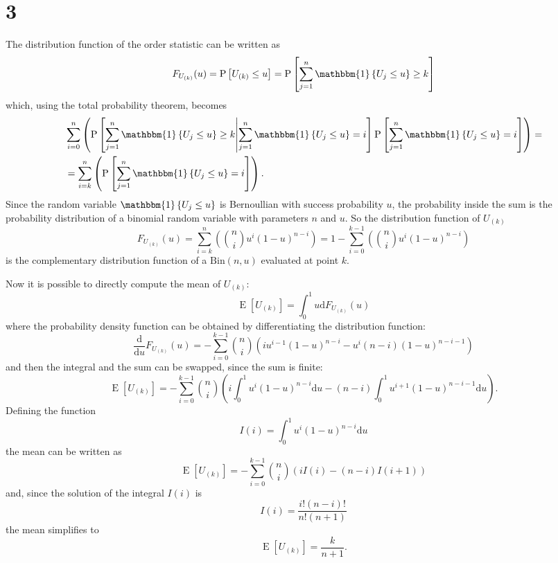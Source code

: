 \documentclass{article}
\newcommand{\E}[1]{\operatorname{E}\left[#1\right]}
\newcommand{\Prob}[1]{\operatorname{P}\left[#1\right]}
\newcommand{\ProbC}[2]{\operatorname{P}\left[#1\middle|#2\right]}
\newcommand{\ind}[1]{\operatorname{\mathbbm{1}}\left\{#1\right\}}
\begin{document}
\section*{3}
The distribution function of the order statistic can be written as
\[ F_{U_{(k)}}(u) = \Prob{U_{(k)} \leq u} = \Prob{\sum_{j=1}^n\ind{U_j \leq u} \geq k} \]
which, using the total probability theorem, becomes
\begin{align*}
  & \sum_{i=0}^n\left(\ProbC{\sum_{j=1}^n\ind{U_j \leq u} \geq k}{\sum_{j=1}^n\ind{U_j \leq u} = i}\Prob{\sum_{j=1}^n\ind{U_j \leq u} = i}\right) = \\
  &= \sum_{i=k}^n\left( \Prob{\sum_{j=1}^n\ind{U_j \leq u} = i} \right) . 
\end{align*}
Since the random variable $\ind{U_j \leq u}$ is Bernoullian with
success probability $u$, the probability inside the sum is the
probability distribution of a binomial random variable with parameters
$n$ and $u$. So the distribution function of $U_{(k)}$
\[  F_{U_{(k)}}(u) = \sum_{i=k}^n\left(\binom{n}{i}u^i(1-u)^{n-i}\right)
= 1 - \sum_{i=0}^{k-1}\left(\binom{n}{i}u^i(1-u)^{n-i}\right) \]
is the complementary distribution function of a
$\mathrm{Bin}(n,u)$ evaluated at point $k$.

Now it is possible to directly compute the mean of $U_{(k)}$:
\[ \E{U_{(k)}} = \int_0^1 u \mathrm{d} F_{U_{(k)}}(u) \]
where the probability density function can be obtained by
differentiating the distribution function:
\[ \frac{\mathrm{d}}{\mathrm{d}u} F_{U_{(k)}}(u) =
- \sum_{i=0}^{k-1}\binom{n}{i}\left( iu^{i-1}(1-u)^{n-i} - u^i(n-i)(1-u)^{n-i-1} \right) \]
and then the integral and the sum can be swapped, since the sum is finite:
\[ \E{U_{(k)}} = -\sum_{i=0}^{k-1}\binom{n}{i}\left( i\int_0^1u^i(1-u)^{n-i}\mathrm{d}u - (n-i)\int_0^1u^{i+1}(1-u)^{n-i-1}\mathrm{d}u \right) . \]
Defining the function
\[ I(i) = \int_0^1u^i(1-u)^{n-i} \mathrm{d}u \]
the mean can be written as
\[ \E{U_{(k)}} = -\sum_{i=0}^{k-1}\binom{n}{i}\left( iI(i) - (n-i)I(i+1) \right) \]
and, since the solution of the integral $I(i)$ is
\[ I(i) = \frac{i!(n-i)!}{n!(n+1)} \]
the mean simplifies to
\[ \E{U_{(k)}} = \frac{k}{n+1} . \]
\end{document}
